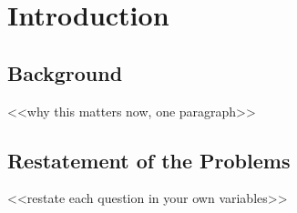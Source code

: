 \documentclass[<<options>>]{apmcmthesis}
\begin{document}
\thispagestyle{empty}
\begin{abstract}
\textbf{Background and Task} <<one sentence with a number>>. This paper addresses
<<N>> problems: <<task 1>>; <<task 2>>; <<task 3>>. <<N>> models are developed.

\textbf{Modeling Framework} <<Q1 model>>, based on which <<Q2 model>>, and extending
to <<Q3 model>>.

\textbf{Results per Question} <<Q1 number + conclusion>>; <<Q2 number + conclusion>>;
<<Q3 number + conclusion>>.

\textbf{Validation and Limitation} <<validation 1 with number>>; <<validation 2 with
number>>. The main limitation is that <<one concrete limitation with a number>>.

\end{abstract}

\newpage
\tableofcontents
\newpage
\pagestyle{mainmatterstyle}
\setcounter{page}{1}

\section{Introduction}
\subsection{Background}
<<why this matters now, one paragraph>>
\subsection{Restatement of the Problems}
<<restate each question in your own variables>>
\end{document}
